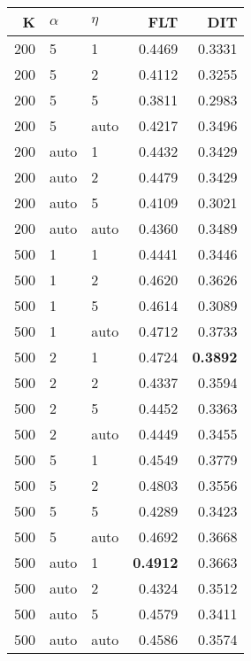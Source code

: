 \begin{table}
\begin{spacing}{1.2}
{\begin{tabular}{rll|rr}
\bottomrule
\end{tabular}
} \hfill \parbox{.45\linewidth}{\centering \begin{tabular}{rll|rr}
\toprule
   K & $\alpha$ &   $\eta$ & FLT &       DIT \\
\midrule
 200 &     5 &     1 &           0.4469 &       0.3331 \\
 200 &     5 &     2 &           0.4112 &       0.3255 \\
 200 &     5 &     5 &           0.3811 &       0.2983 \\
 200 &     5 &  auto &           0.4217 &       0.3496 \\
 200 &  auto &     1 &           0.4432 &       0.3429 \\
 200 &  auto &     2 &           0.4479 &       0.3429 \\
 200 &  auto &     5 &           0.4109 &       0.3021 \\
 200 &  auto &  auto &           0.4360 &       0.3489 \\
 500 &     1 &     1 &           0.4441 &       0.3446 \\
 500 &     1 &     2 &           0.4620 &       0.3626 \\
 500 &     1 &     5 &           0.4614 &       0.3089 \\
 500 &     1 &  auto &           0.4712 &       0.3733 \\
 500 &     2 &     1 &           0.4724 & {\bf 0.3892} \\
 500 &     2 &     2 &           0.4337 &       0.3594 \\
 500 &     2 &     5 &           0.4452 &       0.3363 \\
 500 &     2 &  auto &           0.4449 &       0.3455 \\
 500 &     5 &     1 &           0.4549 &       0.3779 \\
 500 &     5 &     2 &           0.4803 &       0.3556 \\
 500 &     5 &     5 &           0.4289 &       0.3423 \\
 500 &     5 &  auto &           0.4692 &       0.3668 \\
 500 &  auto &     1 &     {\bf 0.4912} &       0.3663 \\
 500 &  auto &     2 &           0.4324 &       0.3512 \\
 500 &  auto &     5 &           0.4579 &       0.3411 \\
 500 &  auto &  auto &           0.4586 &       0.3574 \\
\bottomrule
\end{tabular}
}
\end{spacing}
\end{table}
